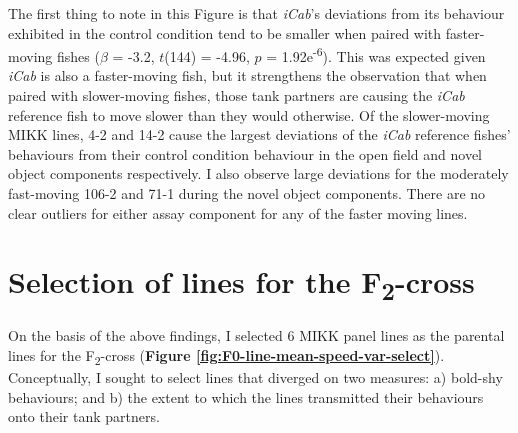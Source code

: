 \documentclass[
]{book}
\begin{document}
The first thing to note in this Figure is that \emph{\textcolor{iCab_424B4D}{iCab}}'s deviations from its behaviour exhibited in the control condition tend to be smaller when paired with faster-moving fishes (\(\beta\) = -3.2, \(t\)(144) = -4.96, \(p\) = 1.92e\textsuperscript{-6}). This was expected given \emph{\textcolor{iCab_424B4D}{iCab}} is also a faster-moving fish, but it strengthens the observation that when paired with slower-moving fishes, those tank partners are causing the \emph{\textcolor{iCab_424B4D}{iCab}} reference fish to move slower than they would otherwise. Of the slower-moving MIKK lines, \textcolor{4-2_FC61D4}{4-2} and \textcolor{14-2_F066EA}{14-2} cause the largest deviations of the \emph{\textcolor{iCab_424B4D}{iCab}} reference fishes' behaviours from their control condition behaviour in the open field and novel object components respectively. I also observe large deviations for the moderately fast-moving \textcolor{106-2_00B9E3}{106-2} and \textcolor{71-1_00BECD}{71-1} during the novel object components. There are no clear outliers for either assay component for any of the faster moving lines.

\hypertarget{selection-of-lines-for-the-f2-cross}{%
\section{\texorpdfstring{Selection of lines for the F\textsubscript{2}-cross}{Selection of lines for the F2-cross}}\label{selection-of-lines-for-the-f2-cross}}

On the basis of the above findings, I selected 6 MIKK panel lines as the parental lines for the F\textsubscript{2}-cross (\textbf{Figure \ref{fig:F0-line-mean-speed-var-select}}). Conceptually, I sought to select lines that diverged on two measures: a) bold-shy behaviours; and b) the extent to which the lines transmitted their behaviours onto their tank partners.
\end{document}
